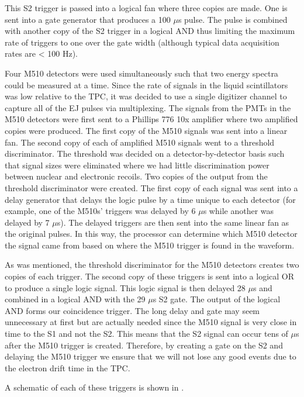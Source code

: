 This S2 trigger is passed into a logical fan where three copies are made.  One is sent into a gate generator that produces a 100 $\mu$s \nimbar{} pulse.  The \nimbar{} pulse is combined with another copy of the S2 trigger in a logical AND thus limiting the maximum rate of triggers to one over the gate width (although typical data acquisition rates are < 100 Hz).

Four M510 detectors were used simultaneously such that two energy spectra could be measured at a time.  Since the rate of signals in the liquid scintillators was low relative to the TPC, it was decided to use a single digitizer channel to capture all of the EJ pulses via multiplexing.  The signals from the PMTs in the M510 detectors were first sent to a Phillips 776 10x amplifier where two amplified copies were produced.  The first copy of the M510 signals was sent into a linear fan.  The second copy of each of amplified M510 signals went to a threshold discriminator.  The threshold was decided on a detector-by-detector basis such that signal sizes were eliminated where we had little discrimination power between nuclear and electronic recoils.  Two copies of the output from the threshold discriminator were created.  The first copy of each signal was sent into a delay generator that delays the logic pulse by a time unique to each detector (for example, one of the M510s' triggers was delayed by 6 $\mu$s while another was delayed by 7 $\mu$s).  The delayed triggers are then sent into the same linear fan as the original pulses.  In this way, the processor can determine which M510 detector the signal came from based on where the M510 trigger is found in the waveform.  

As was mentioned, the threshold discriminator for the M510 detectors creates two copies of each trigger.  The second copy of these triggers is sent into a logical OR to produce a single logic signal.  This logic signal is then delayed 28 $\mu$s and combined in a logical AND with the 29 $\mu$s S2 gate.  The output of the logical AND forms our coincidence trigger.  The long delay and gate may seem unnecessary at first but are actually needed since the M510 signal is very close in time to the S1 and not the S2.  This means that the S2 signal can occur tens of $\mu$s after the M510 trigger is created.  Therefore, by creating a gate on the S2 and delaying the M510 trigger we ensure that we will not lose any good events due to the electron drift time in the TPC.  

A schematic of each of these triggers is shown in .


